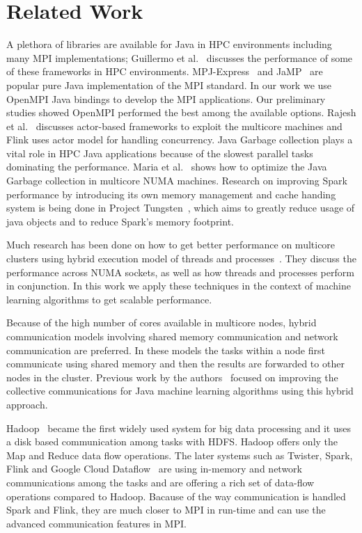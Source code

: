 \documentclass[10pt, conference, compsocconf]{IEEEtran}
\begin{document}
\section{Related Work} \label{sec:related}
A plethora of libraries are available for Java in HPC environments including many MPI implementations; Guillermo et al.~\cite{taboada2013java} discusses the performance of some of these frameworks in HPC environments. MPJ-Express~\cite{baker2006mpj} and JaMP~\cite{klemm2007jamp} are popular pure Java implementation of the MPI standard. In our work we use OpenMPI Java bindings to develop the MPI applications. Our preliminary studies showed OpenMPI performed the best among the available options. Rajesh et al.~\cite{karmani2009actor} discusses actor-based frameworks to exploit the multicore machines and Flink uses actor model for handling concurrency. Java Garbage collection plays a vital role in HPC Java applications because of the slowest parallel tasks dominating the performance. Maria et al.~\cite{carpen2015performance} shows how to optimize the Java Garbage collection in multicore NUMA machines. Research on improving Spark performance by introducing its own memory management and cache handing system is being done in Project Tungsten~\cite{tungsten}, which aims to greatly reduce usage of java objects and to reduce Spark's memory footprint. 

Much research has been done on how to get better performance on multicore clusters using hybrid execution model of threads and processes~\cite{chorley2010performance, rabenseifner2009hybrid, camp2011streamline}. They discuss the performance across NUMA sockets, as well as how threads and processes perform in conjunction. In this work we apply these techniques in the context of machine learning algorithms to get scalable performance.

Because of the high number of cores available in multicore nodes, hybrid communication models involving shared memory communication and network communication are preferred. In these models the tasks within a node first communicate using shared memory and then the results are forwarded to other nodes in the cluster. Previous work by the authors~\cite{hpc2016:spidaljava} focused on improving the collective communications for Java machine learning algorithms using this hybrid approach. 

Hadoop~\cite{lam2010hadoop} became the first widely used system for big data processing and it uses a disk based communication among tasks with HDFS. Hadoop offers only the Map and Reduce data flow operations. The later systems such as Twister, Spark, Flink and Google Cloud Dataflow~\cite{akidau2015dataflow} are using in-memory and network communications among the tasks and are offering a rich set of data-flow operations compared to Hadoop. Bacause of the way communication is handled Spark and Flink, they are much closer to MPI in run-time and can use the advanced communication features in MPI. 
\end{document}
